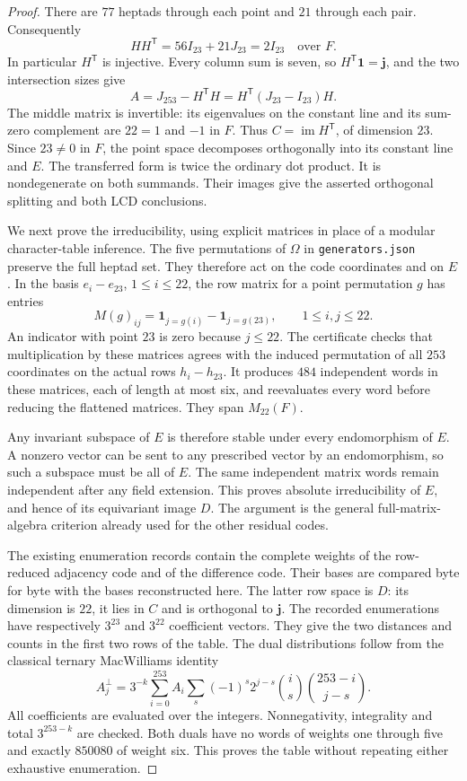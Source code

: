 \documentclass[11pt]{article}
\newcommand{\im}{\operatorname{im}}
\begin{document}
\begin{proof}
There are $77$ heptads through each point and $21$ through each pair.
Consequently
\[
 HH^{\mathsf T}=56I_{23}+21J_{23}=2I_{23}\quad\text{over }F.
\]
In particular $H^{\mathsf T}$ is injective. Every column sum is seven,
so $H^{\mathsf T}\mathbf1=\mathbf j$, and the two intersection sizes give
\[
 A=J_{253}-H^{\mathsf T}H
   =H^{\mathsf T}(J_{23}-I_{23})H.
\]
The middle matrix is invertible: its eigenvalues on the constant line
and its sum-zero complement are $22=1$ and $-1$ in $F$.
Thus $C=\im H^{\mathsf T}$, of dimension $23$.
Since $23\ne0$ in $F$, the point space decomposes orthogonally into its
constant line and $E$. The transferred form is twice the ordinary dot
product. It is nondegenerate on both summands. Their images give the
asserted orthogonal splitting and both LCD conclusions.

We next prove the irreducibility, using explicit matrices in place of a
modular character-table inference. The five permutations of $\Omega$
in \texttt{generators.json} preserve the full heptad set. They therefore
act on the code coordinates and on $E$. In the basis
$e_i-e_{23}$, $1\leq i\leq22$, the row matrix for a point permutation
$g$ has entries
\[
 M(g)_{ij}=\mathbf1_{j=g(i)}-\mathbf1_{j=g(23)},\qquad 1\leq i,j\leq22.
\]
An indicator with point $23$ is zero because $j\leq22$.
The certificate checks that multiplication by these matrices agrees
with the induced permutation of all $253$ coordinates on the actual
rows $h_i-h_{23}$. It produces $484$ independent words in these matrices,
each of length at most six, and reevaluates every word before reducing
the flattened matrices. They span $M_{22}(F)$.

Any invariant subspace of $E$ is therefore stable under every endomorphism
of $E$. A nonzero vector can be sent to any prescribed vector by an
endomorphism, so such a subspace must be all of $E$. The same independent
matrix words remain independent after any field extension. This proves
absolute irreducibility of $E$, and hence of its equivariant image $D$.
The argument is the general full-matrix-algebra criterion already used
for the other residual codes.

The existing enumeration records contain the complete weights of the
row-reduced adjacency code and of the difference code. Their bases are
compared byte for byte with the bases reconstructed here. The latter
row space is $D$: its dimension is $22$, it lies in $C$ and is orthogonal
to $\mathbf j$. The recorded enumerations have respectively $3^{23}$
and $3^{22}$ coefficient vectors. They give the two distances and counts
in the first two rows of the table. The dual distributions follow from
the classical ternary MacWilliams identity
\[
 A_j^\perp=3^{-k}\sum_{i=0}^{253} A_i
 \sum_s(-1)^s2^{j-s}\binom is\binom{253-i}{j-s}.
\]
All coefficients are evaluated over the integers. Nonnegativity,
integrality and total $3^{253-k}$ are checked. Both duals have no words
of weights one through five and exactly $850080$ of weight six.
This proves the table without repeating either exhaustive enumeration.


\end{proof}
\end{document}
